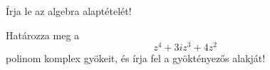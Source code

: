 \documentclass[11pt]{scrartcl}
\begin{document}
Írja le az algebra alaptételét!

Határozza meg a
\[
	z^4 + 3i z^3 + 4z^2
\]
polinom komplex gyökeit, és írja fel a gyöktényezős alakját!
\end{document}
